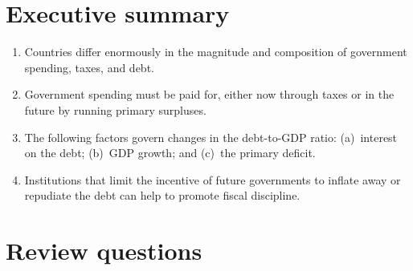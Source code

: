 \section*{Executive summary}

\setlength{\leftmargini}{.5\oldleftmargini}
\begin{enumerate}

\item Countries differ enormously in the magnitude and composition
of government spending, taxes, and debt.

\item Government spending must be paid for, either now through
taxes or in the future by running primary surpluses.

\item The following factors govern changes in the debt-to-GDP ratio:
(a)~interest on the debt;
(b)~GDP growth;
and (c)~the primary deficit.

\item Institutions that limit the incentive of future governments to inflate
away or repudiate the debt can help to promote fiscal discipline.

\end{enumerate}
\setlength{\leftmargini}{\oldleftmargini}

\section*{Review questions}

